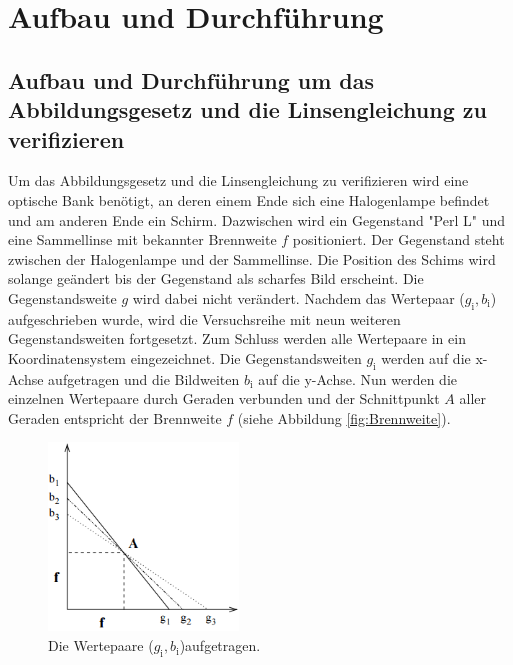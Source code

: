 \section{Aufbau und Durchführung}
\label{sec:Durchführung}

\subsection{Aufbau und Durchführung um das Abbildungsgesetz und die Linsengleichung zu verifizieren}
\label{sec:Versuchsaufbau}
Um das Abbildungsgesetz und die Linsengleichung zu verifizieren wird eine optische Bank benötigt, an deren einem Ende sich eine Halogenlampe befindet und am anderen Ende ein Schirm. Dazwischen wird ein Gegenstand "Perl L" und eine Sammellinse mit bekannter Brennweite $f$ positioniert. Der Gegenstand steht zwischen der Halogenlampe und der Sammellinse. Die Position des Schims wird solange geändert bis der Gegenstand als scharfes Bild erscheint. Die Gegenstandsweite $g$ wird dabei nicht verändert. Nachdem das Wertepaar ($g_\text{i}, b_\text{i}$) aufgeschrieben wurde, wird die Versuchsreihe mit neun weiteren Gegenstandsweiten fortgesetzt. Zum Schluss werden alle Wertepaare in ein Koordinatensystem eingezeichnet. Die Gegenstandsweiten $g_\text{i}$ werden auf die x-Achse aufgetragen und die Bildweiten $b_\text{i}$ auf die y-Achse. Nun werden die einzelnen Wertepaare durch Geraden verbunden und der Schnittpunkt $A$ aller Geraden entspricht der Brennweite $f$ (siehe Abbildung \eqref{fig:Brennweite}).

\begin{figure}[H]
  \centering
  \includegraphics[height=5cm]{picture/Brennweite}
  \caption{Die Wertepaare ($g_\text{i}, b_\text{i}$)aufgetragen. \cite[3]{sample}}
  \label{fig:Brennweite}
\end{figure}


